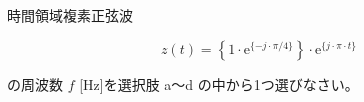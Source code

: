 時間領域複素正弦波

\[
z(t) =  \left \{ 1 \cdot \textrm{e}^{\{-j \cdot \pi/4 \}} \right \} \cdot \textrm{e}^{\{ j \cdot \pi \cdot t \}}
\]

\bigskip
\noindent の周波数 $f$ [Hz]を選択肢 a〜d の中から1つ選びなさい。
